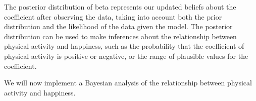 \documentclass{article}
\begin{document}
The posterior distribution of beta represents our updated beliefs about
the coefficient after observing the data, taking into account both the
prior distribution and the likelihood of the data given the model. The
posterior distribution can be used to make inferences about the
relationship between physical activity and happiness, such as the
probability that the coefficient of physical activity is positive or
negative, or the range of plausible values for the coefficient.

We will now implement a Bayesian analysis of the relationship between
physical activity and happiness.

\begin{Shaded}
\begin{Highlighting}[]
\SpecialCharTok{::}\SpecialCharTok{$}\NormalTok{(}\NormalTok{, }\NormalTok{, }\NormalTok{,}\NormalTok{, }\NormalTok{, }\NormalTok{)}


\OtherTok{\textless{}{-}} 
\OtherTok{\textless{}{-}} \NormalTok{(}\SpecialCharTok{*} \NormalTok{, } 
\OtherTok{\textless{}{-}} 
\OtherTok{\textless{}{-}}  \NormalTok{, }
\OtherTok{\textless{}{-}}\SpecialCharTok{+}\SpecialCharTok{\%*\%}\SpecialCharTok{+}
  \NormalTok{(}\NormalTok{(}
\NormalTok{\}}

\NormalTok{(}\NormalTok{)}


\end{Highlighting}
\end{Shaded}
\end{document}
